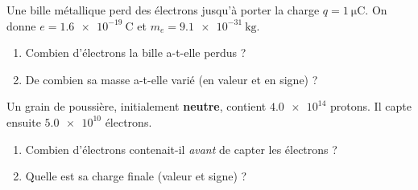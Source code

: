 \documentclass[11pt,a4paper]{article}
\begin{document}
\begin{exo}
Une bille métallique perd des électrons jusqu'à porter la charge $q = \SI{+1}{\micro\coulomb}$.
On donne $e = \num{1.6e-19}\ \si{\coulomb}$ et $m_e = \num{9.1e-31}\ \si{\kilogram}$.
\begin{enumerate}[label=\alph*)]
  \item Combien d'électrons la bille a-t-elle perdus ?
  \item De combien sa masse a-t-elle varié (en valeur et en signe) ?
\end{enumerate}
\end{exo}

\begin{exo}
Un grain de poussière, initialement \textbf{neutre}, contient $\num{4.0e14}$ protons. Il capte
ensuite $\num{5.0e10}$ électrons.
\begin{enumerate}[label=\alph*)]
  \item Combien d'électrons contenait-il \emph{avant} de capter les électrons ?
  \item Quelle est sa charge finale (valeur et signe) ?
\end{enumerate}
\end{exo}
\end{document}
